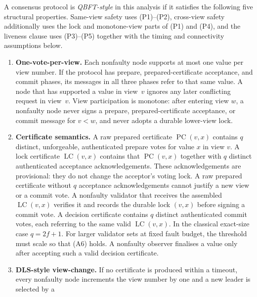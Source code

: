 \begin{definition}
\label{def:qbft-style}
A consensus protocol is \emph{QBFT-style} in this analysis if it satisfies
the following five structural properties.  Same-view safety uses
(P1)--(P2), cross-view safety additionally uses the lock and monotone-view
parts of (P1) and (P4), and the liveness clause uses (P3)--(P5) together
with the timing and connectivity assumptions below.
\begin{enumerate}[(P1)]
  \item \textbf{One-vote-per-view.}
        Each nonfaulty node supports at most one value per view number.
        If the protocol has prepare, prepared-certificate acceptance, and
        commit phases, its messages in all three phases refer to that same
        value.  A node that has supported a value in
        view~$v$ ignores any later conflicting request in view~$v$.
        View participation is monotone: after entering view \(w\), a
        nonfaulty node never signs a prepare, prepared-certificate acceptance,
        or commit message for \(v<w\), and never adopts a durable lower-view
        lock.
  \item \textbf{Certificate semantics.}
        A raw prepared certificate
        \(\operatorname{PC}(v,x)\) contains \(q\) distinct, unforgeable,
        authenticated prepare votes for value \(x\) in view \(v\).
        A lock certificate \(\operatorname{LC}(v,x)\) contains that
        \(\operatorname{PC}(v,x)\) together with \(q\) distinct authenticated
        acceptance acknowledgements. These acknowledgements are provisional:
        they do not change the acceptor's voting lock. A raw prepared
        certificate without \(q\) acceptance acknowledgements cannot justify a
        new view or a commit vote. A nonfaulty validator that receives the
        assembled \(\operatorname{LC}(v,x)\) verifies it and records the
        durable lock \((v,x)\) before signing a commit vote. A decision
        certificate contains \(q\) distinct authenticated commit votes, each
        referring to the same valid \(\operatorname{LC}(v,x)\).  In the
        classical exact-size case \(q=2f+1\).  For larger validator sets at
        fixed fault budget, the threshold must scale so that (A6) holds.
        A nonfaulty observer finalises a value only after accepting such a
        valid decision certificate.
  \item \textbf{DLS-style view-change.}
        If no certificate is produced within a timeout, every nonfaulty node
        increments the view number by one and a new leader is selected by a

\end{enumerate}
\end{definition}
